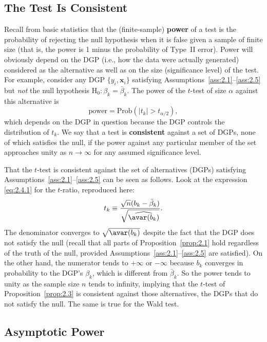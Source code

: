 \subsection*{The Test Is Consistent}

Recall from basic statistics that the (finite-sample) \textbf{power} of a test is the
probability of rejecting the null hypothesis when it is false given a sample of finite
size (that is, the power is 1 minus the probability of Type~II error).  Power will
obviously depend on the DGP (i.e., how the data were actually generated) considered
as the alternative as well as on the size (significance level) of the test.  For
example, consider any DGP $\{y_i, \mathbf{x}_i\}$ satisfying
Assumptions~\ref{ass:2.1}--\ref{ass:2.5} but \emph{not} the null hypothesis
$\mathrm{H}_0\colon \beta_k = \bar{\beta}_k$.  The power of the $t$-test of size
$\alpha$ against this alternative is
\[
  \text{power} = \mathrm{Prob}(|t_k| > t_{\alpha/2}),
\]
which depends on the DGP in question because the DGP controls the distribution of
$t_k$.  We say that a test is \textbf{consistent} against a set of DGPs, none of which
satisfies the null, if the power against any particular member of the set approaches
unity as $n \to \infty$ for any assumed significance level.

That the $t$-test is consistent against the set of alternatives (DGPs) satisfying
Assumptions~\ref{ass:2.1}--\ref{ass:2.5} can be seen as follows.  Look at the
expression \eqref{eq:2.4.1} for the $t$-ratio, reproduced here:
\[
  t_k \equiv \frac{\sqrt{n}(b_k - \bar{\beta}_k)}
  {\sqrt{\widehat{\avar(b_k)}}}.
\]
The denominator converges to $\sqrt{\avar(b_k)}$ despite the fact that the DGP does
not satisfy the null (recall that all parts of Proposition~\ref{prop:2.1} hold
regardless of the truth of the null, provided Assumptions~\ref{ass:2.1}--\ref{ass:2.5}
are satisfied).  On the other hand, the numerator tends to $+\infty$ or $-\infty$
because $b_k$ converges in probability to the DGP's $\beta_k$, which is different
from $\bar{\beta}_k$.  So the power tends to unity as the sample size $n$ tends to
infinity, implying that the $t$-test of Proposition~\ref{prop:2.3} is consistent
against those alternatives, the DGPs that do not satisfy the null.  The same is true
for the Wald test.

\subsection*{Asymptotic Power}

